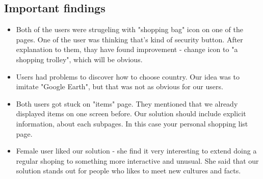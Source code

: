 \subsection{Important findings}
\begin{itemize}
	\item Both of the users were strugeling with "shopping bag" icon on one of the pages. One of the user was thinking that's kind of security button. After explanation to them, thay have found improvement - change icon to "a shopping trolley", which will be obvious.
	\item Users had problems to discover how to choose country. Our idea was to imitate "Google Earth", but that was not as obvious for our users. 
	\item Both users got stuck on "items" page. They mentioned that we already displayed items on one screen before. Our solution should include explicit information, about each subpages. In this case your personal shopping list page.
	\item Female user liked our solution - she find it very interesting to extend doing a regular shoping to something more interactive and unusual. She said that our solution stands out for people who likes to meet new cultures and facts.
\end{itemize}